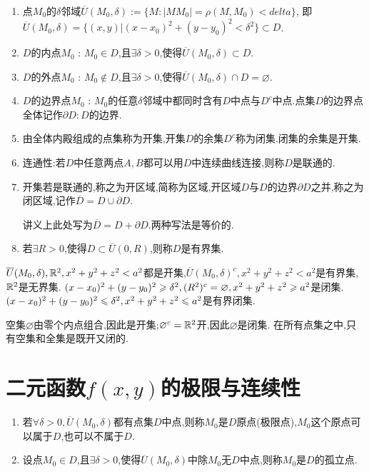 \begin{enumerate}
    \item 点$M_0$的$\delta$邻域$\overline U(M_0,\delta) := \{ M : |MM_0| = \rho(M,M_0) < delta \}$,
    即$\overline U(M_0,\delta) = \{ (x,y) | (x-x_0)^2 + (y-y_0)^2 < \delta^2 \} \subset D$.
    \item $D$的内点$M_0$ : $M_0 \in D$,且$\exists \delta > 0 $,使得$\overline U(M_0,\delta) \subset D$.
    \item $D$的外点$M_0$ : $M_0 \notin D$,且$\exists \delta > 0 $,使得$\overline U(M_0,\delta) \cap D = \varnothing$.
    \item $D$的边界点$M_0$ : $M_0$的任意$\delta$邻域中都同时含有$D$中点与$D^c$中点.点集$D$的边界点全体记作$\partial D: D$的边界.
    \item 由全体内殿组成的点集称为开集,开集$D$的余集$D^c$称为闭集.闭集的余集是开集.
    \item 连通性:若$D$中任意两点$A,B$都可以用$D$中连续曲线连接,则称$D$是联通的.
    \item 开集若是联通的,称之为开区域,简称为区域,开区域$D$与$D$的边界$\partial D$之并,称之为闭区域,记作$\overline D = D \cup \partial D$.
    \begin{remark}
    讲义上此处写为$\overline{D} = D + \partial D$.两种写法是等价的.
\end{remark}
    \item 若$\exists R >0$,使得$D \subset \overline{U}(0,R)$,则称$D$是有界集.
\end{enumerate}

\begin{example}
    $\overline U(M_0,\delta), \mathbb{R}^2, x^2+y^2+z^2<a^2$都是开集,$\overline U(M_0,\delta)^c, x^2+y^2+z^2 < a^2$是有界集,$\mathbb{R}^2$是无界集.
    $(x-x_0)^2 + (y-y_0)^2 \geqslant \delta^2, (R^2)^c = \varnothing, x^2+y^2+z^2 \geqslant a^2$是闭集.
    $(x-x_0)^2 + (y-y_0)^2 \leqslant \delta^2, x^2+y^2+z^2 \leqslant a^2$是有界闭集.
\end{example}

\begin{example}
    空集$\varnothing$由零个内点组合,因此是开集;$\varnothing^c = \mathbb{R}^2$开,因此$\varnothing$是闭集.
    在所有点集之中,只有空集和全集是既开又闭的.
\end{example}

\section{二元函数$f(x,y)$的极限与连续性}

\begin{enumerate}
    \item 若$\forall \delta >0, \overline U(M_0,\delta)$都有点集$D$中点,则称$M_0$是$D$原点(极限点),$M_0$这个原点可以属于$D$,也可以不属于$D$.
    \item 设点$M_0 \in D$,且$\exists \delta > 0 $,使得$\overline U(M_0,\delta)$中除$M_0$无$D$中点,则称$M_0$是$D$的孤立点.
\end{enumerate}

